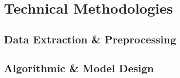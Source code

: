 \chapter{Technical Methodologies}
\label{chap:methodologies}

\section{Data Extraction \& Preprocessing}

\section{Algorithmic \& Model Design}

